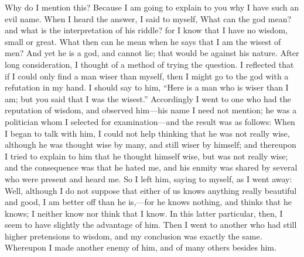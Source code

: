 \documentclass[11pt,letter]{article}
\begin{document}
\par  Why do I mention this? Because I am going to explain to you why I have such an evil name. When I heard the answer, I said to myself, What can the god mean? and what is the interpretation of his riddle? for I know that I have no wisdom, small or great. What then can he mean when he says that I am the wisest of men? And yet he is a god, and cannot lie; that would be against his nature. After long consideration, I thought of a method of trying the question. I reflected that if I could only find a man wiser than myself, then I might go to the god with a refutation in my hand. I should say to him, “Here is a man who is wiser than I am; but you said that I was the wisest.” Accordingly I went to one who had the reputation of wisdom, and observed him—his name I need not mention; he was a politician whom I selected for examination—and the result was as follows: When I began to talk with him, I could not help thinking that he was not really wise, although he was thought wise by many, and still wiser by himself; and thereupon I tried to explain to him that he thought himself wise, but was not really wise; and the consequence was that he hated me, and his enmity was shared by several who were present and heard me. So I left him, saying to myself, as I went away: Well, although I do not suppose that either of us knows anything really beautiful and good, I am better off than he is,—for he knows nothing, and thinks that he knows; I neither know nor think that I know. In this latter particular, then, I seem to have slightly the advantage of him. Then I went to another who had still higher pretensions to wisdom, and my conclusion was exactly the same. Whereupon I made another enemy of him, and of many others besides him.
\end{document}
